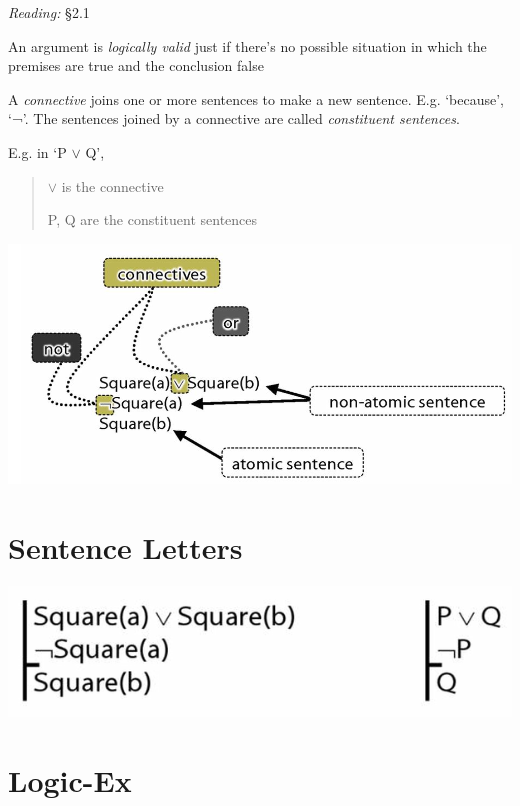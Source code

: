 \documentclass[12pt]{extarticle}
\begin{document}
\begin{multicols*}{3}
\emph{Reading:} §2.1
 
An argument is \emph{logically valid} just if there’s no possible situation in which the premises are true and the conclusion false
 
A \emph{connective} joins one or more sentences to make a new sentence. E.g. ‘because’, ‘¬’. The sentences joined by a connective are called \emph{constituent sentences}.
 
E.g. in ‘P $\lor{}$ Q’,
 
\begin{quote}
 
$\lor{}$ is the connective
 
P, Q are the constituent sentences
 
\end{quote}
 
\begin{center}
\includegraphics[scale=0.3]{img/terminology_more.png}
\end{center}
 
 
\section{Sentence Letters}
 
\begin{center}
\includegraphics[scale=0.3]{img/sentence_letters.png}
\end{center}
 
 
 
\section{Logic-Ex}
 

\end{multicols*}
\end{document}

